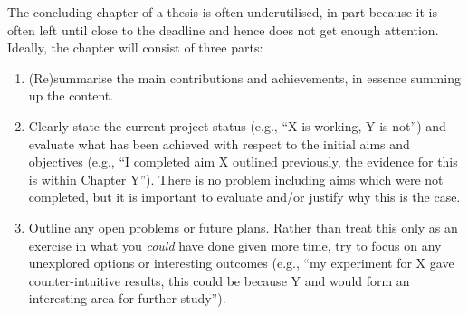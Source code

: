 \documentclass[ %
                    author={Luke Murray},
                supervisor={Dr. Simon Hollis},
                     title={Shadow Peer-to-Peer Networks},
                  subtitle={},
                    degree={MEng},
                      year={2013} ]{thesis}
\begin{document}
\noindent
The concluding chapter of a thesis is often underutilised, in part because
it is often left until close to the deadline and hence does not get enough 
attention.  Ideally, the chapter will consist of three parts:

\begin{enumerate}
\item (Re)summarise the main contributions and achievements, in essence
      summing up the content.
\item Clearly state the current project status (e.g., ``X is working, Y 
      is not'') and evaluate what has been achieved with respect to the 
      initial aims and objectives (e.g., ``I completed aim X outlined 
      previously, the evidence for this is within Chapter Y'').  There 
      is no problem including aims which were not completed, but it is 
      important to evaluate and/or justify why this is the case.
\item Outline any open problems or future plans.  Rather than treat this
      only as an exercise in what you {\em could} have done given more 
      time, try to focus on any unexplored options or interesting outcomes
      (e.g., ``my experiment for X gave counter-intuitive results, this 
      could be because Y and would form an interesting area for further 
      study'').
\end{enumerate}


%
%

\backmatter




\end{document}
